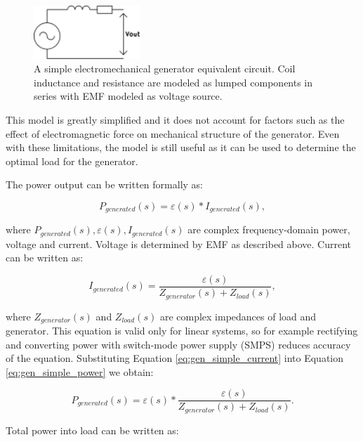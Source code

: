 \begin{figure}[htb]
\begin{center}
\includegraphics[height=2cm]{images/own_dwg/gen_simple}
\end{center}
\caption{A simple electromechanical generator equivalent circuit. Coil inductance and resistance are modeled as lumped components in series with EMF modeled as voltage source.}
\label{gen_simple}
\end{figure}

This model is greatly simplified and it does not account for factors such as the effect of electromagnetic force on mechanical structure of the generator. Even with these limitations, the model is still useful as it can be used to determine the optimal load for the generator. 

The power output can be written formally as:

\begin{equation} \label{eq:gen_simple_power}
  P_{generated}(s) = \varepsilon(s)*I_{generated}(s),
\end{equation}

where $P_{generated}(s), \varepsilon(s), I_{generated}(s)$ are complex frequency-domain power, voltage and current. Voltage is determined by EMF as described above. Current can be written as: 

\begin{equation} \label{eq:gen_simple_current}
  I_{generated}(s) = \frac{\varepsilon(s)}{Z_{generator}(s)+Z_{load}(s)},
\end{equation}

where $Z_{generator}(s) $ and $ Z_{load}(s)$ are complex impedances of load and generator. This equation is valid only for linear systems, so for example rectifying and converting power with switch-mode power supply (SMPS) reduces accuracy of the equation. Substituting Equation \eqref{eq:gen_simple_current} into Equation \eqref{eq:gen_simple_power} we obtain:

\begin{equation}
  P_{generated}(s) = \varepsilon(s)*\frac{\varepsilon(s)}{Z_{generator}(s)+Z_{load}(s)}.
\end{equation}

Total power into load can be written as:

